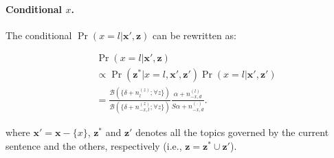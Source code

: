 \paragraph{Conditional $x$.}  The conditional $\Pr(x =
l|\mathbf{x}',\mathbf{z})$ can be rewritten as: 
\begin{small}
\begin{eqnarray*}
  && \Pr(x = l|\mathbf{x}',\mathbf{z}) \nonumber\\
  && \propto \Pr(\mathbf{z}^*|x = l, \mathbf{x}', \mathbf{z}') \Pr(x = l |\mathbf{x}',\mathbf{z}') \\
  && = \frac{\mathcal{B}(\{\delta + n_l^{(z)}; \forall z\})}{\mathcal{B}(\{\delta + n_{-x,l}^{(z)}; \forall z\})}
  \frac{\alpha + n_{-x,d}^{(l)}}{S \alpha + n_{-x,d}^{(\cdot)}}.
\end{eqnarray*}
\end{small}
where $\mathbf{x}' =
\mathbf{x} - \{x\}$, $\mathbf{z}^*$ and $\mathbf{z}'$ denotes all the topics
governed by the current sentence and the others, respectively (i.e.,
$\mathbf{z} = \mathbf{z}^* \cup \mathbf{z}'$).



